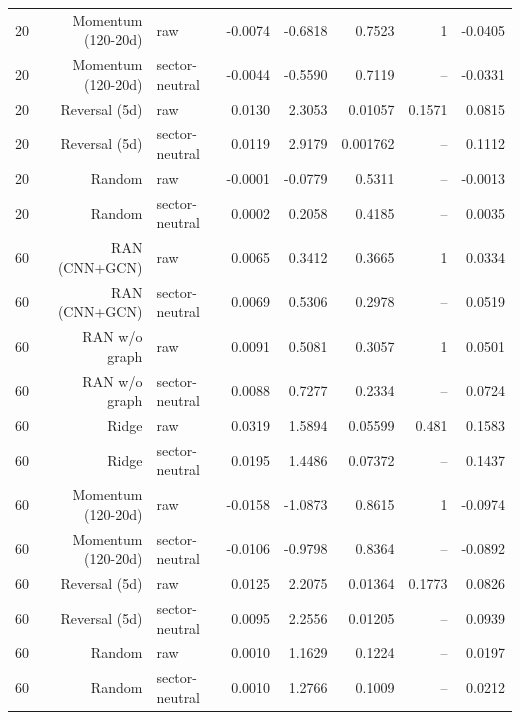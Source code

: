 \documentclass[10pt]{article}
\begin{document}
\begin{longtable}{rrlrrrrr}
20 & Momentum (120-20d) & raw & -0.0074 & -0.6818 & 0.7523 & 1 & -0.0405 \\
20 & Momentum (120-20d) & sector-neutral & -0.0044 & -0.5590 & 0.7119 & -- & -0.0331 \\
20 & Reversal (5d) & raw & 0.0130 & 2.3053 & 0.01057 & 0.1571 & 0.0815 \\
20 & Reversal (5d) & sector-neutral & 0.0119 & 2.9179 & 0.001762 & -- & 0.1112 \\
20 & Random & raw & -0.0001 & -0.0779 & 0.5311 & -- & -0.0013 \\
20 & Random & sector-neutral & 0.0002 & 0.2058 & 0.4185 & -- & 0.0035 \\
60 & RAN (CNN+GCN) & raw & 0.0065 & 0.3412 & 0.3665 & 1 & 0.0334 \\
60 & RAN (CNN+GCN) & sector-neutral & 0.0069 & 0.5306 & 0.2978 & -- & 0.0519 \\
60 & RAN w/o graph & raw & 0.0091 & 0.5081 & 0.3057 & 1 & 0.0501 \\
60 & RAN w/o graph & sector-neutral & 0.0088 & 0.7277 & 0.2334 & -- & 0.0724 \\
60 & Ridge & raw & 0.0319 & 1.5894 & 0.05599 & 0.481 & 0.1583 \\
60 & Ridge & sector-neutral & 0.0195 & 1.4486 & 0.07372 & -- & 0.1437 \\
60 & Momentum (120-20d) & raw & -0.0158 & -1.0873 & 0.8615 & 1 & -0.0974 \\
60 & Momentum (120-20d) & sector-neutral & -0.0106 & -0.9798 & 0.8364 & -- & -0.0892 \\
60 & Reversal (5d) & raw & 0.0125 & 2.2075 & 0.01364 & 0.1773 & 0.0826 \\
60 & Reversal (5d) & sector-neutral & 0.0095 & 2.2556 & 0.01205 & -- & 0.0939 \\
60 & Random & raw & 0.0010 & 1.1629 & 0.1224 & -- & 0.0197 \\
60 & Random & sector-neutral & 0.0010 & 1.2766 & 0.1009 & -- & 0.0212 \\
\bottomrule
\end{longtable}
\endgroup
\end{document}
